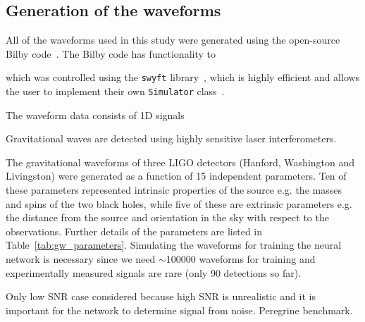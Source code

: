 
\subsection{Generation of the waveforms}

All of the waveforms used in this study were generated using the open-source Bilby code~\cite{Ashton_Bilby_2019}. The Bilby code has functionality to 

which was controlled using the \texttt{swyft} library~\cite{Miller2022}, which is highly efficient and allows the user to implement their own \texttt{Simulator} class~\cite{bhardwaj2023peregrine}.



The waveform data consists of 1D signals 

Gravitational waves are detected using highly sensitive laser interferometers. 

 The gravitational waveforms of three LIGO detectors (Hanford, Washington and Livingston) were generated as a function of 15 independent parameters. Ten of these parameters represented intrinsic properties of the source e.g. the masses and spins of the two black holes, while five of these are extrinsic parameters e.g. the distance from the source and orientation in the sky with respect to the observations. Further details of the parameters are listed in Table~\ref{tab:gw_parameters}. Simulating the waveforms for training the neural network is necessary since we need $\sim$100000 waveforms for training and experimentally measured signals are rare (only 90 detections so far).

Only low SNR case considered because high SNR is unrealistic and it is important for the network to determine signal from noise. Peregrine benchmark.


